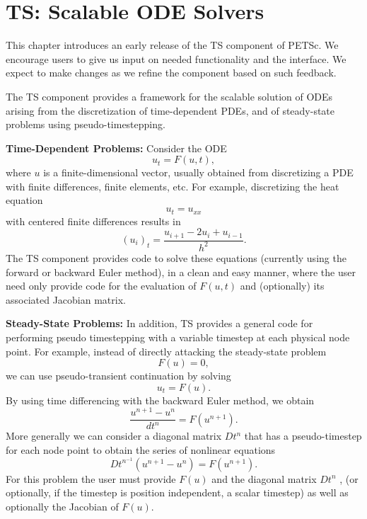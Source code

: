 \chapter{TS: Scalable ODE Solvers}

This chapter introduces an early release of the TS component of PETSc.
We encourage users to give us input on needed functionality and the
interface.  We expect to make changes as we refine the component based
on such feedback.

\medskip \medskip

The TS component provides a framework for the scalable solution of ODEs
arising from the discretization of time-dependent PDEs, and of
steady-state problems using pseudo-timestepping.

\vspace{.2cm}

\noindent
{\bf Time-Dependent Problems:} Consider the ODE
\[
              u_t = F(u,t),
\]
where $ u $ is a finite-dimensional vector, usually obtained from
discretizing a PDE with finite differences, finite elements, etc.
For example, discretizing the heat equation 
\[
          u_t = u_{xx} 
\]
with centered finite differences results in 
\[
          (u_i)_t = \frac{u_{i+1} - 2 u_{i} + u_{i-1}}{h^2}.
\]
The TS component provides code to solve these equations (currently 
using the forward or backward Euler method), in a clean and easy manner,
where the user need only provide code for the evaluation of $ F(u,t) $ and 
(optionally) its associated Jacobian matrix.

\vspace{.2cm}

\noindent
{\bf Steady-State Problems:} 
In addition, TS provides a general code for performing pseudo timestepping
with a variable timestep at each physical node point. For example, instead of
directly attacking the steady-state problem
\[
           F(u) = 0,
\]
we can use pseudo-transient continuation by solving
\[
           u_t = F(u).
\]
By using time differencing with the backward Euler method, we obtain
\[
           \frac{u^{n+1} - u^{n}}{dt^{n}} = F(u^{n+1}).
\]
More generally we can consider a diagonal matrix $ Dt^{n} $ that has a
pseudo-timestep for each node point to obtain the series of nonlinear equations
\[
        Dt^{n^{-1}}(u^{n+1} - u^{n}) =  F(u^{n+1}).
\]
For this problem the user must provide $ F(u) $ and the diagonal 
matrix $ Dt^{n} $ , (or optionally, if the timestep is position independent,
a scalar timestep) as well as optionally the Jacobian of $ F(u) .$ 


